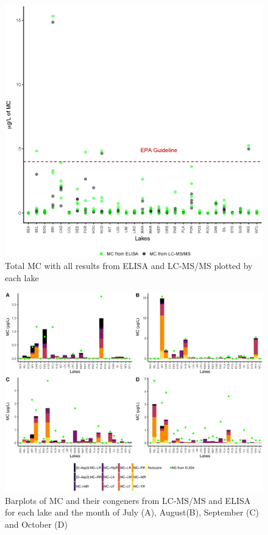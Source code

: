 \begin{figure}[!h]
 \includegraphics[width=\textwidth]{figures/Microcystin}
 \caption{Total MC with all results from ELISA and LC-MS/MS plotted by each lake}
 \label{fig:microcystin}
\end{figure}

\begin{figure} 
	\includegraphics[width=\textwidth]{figures/month}
	\caption{Barplots of MC and their congeners from LC-MS/MS and ELISA  for each lake and the month of July (A), August(B), September (C) and October (D)}
	\label{fig:month} 
\end{figure}


